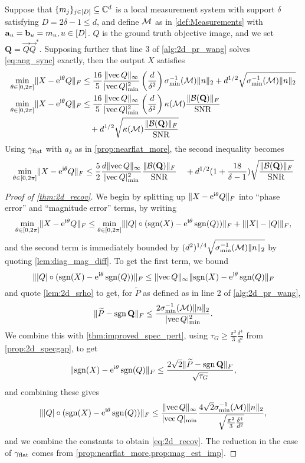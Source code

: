 \begin{theorem} \label{thm:2d_recov}
  Suppose that $\{m_j\}_{j \in [D]} \subseteq \mathbb{C}^d$ is a local measurement system with support $\delta$ satisfying $D = 2 \delta - 1 \le d$, and define $\mathcal{M}$ as in \eqref{def:Measurements} with $\mathbf a_u = \mathbf b_u = m_u, u \in [D]$.  $Q$ is the ground truth objective image, and we set $\mathbf{Q} = \vec Q \vec Q^*$.  Supposing further that line 3 of \cref{alg:2d_pr_wang} solves \eqref{eq:ang_sync} exactly, then the output $X$ satisfies
  \begin{equation}
    \begin{aligned}
      \min_{\theta \in [0, 2\pi]} \lVert X - \mathrm{e}^{\mathrm{i} \theta} Q\rVert_F &\le \frac{16}{5} \dfrac{\lVert\operatorname{vec} Q\rVert_\infty}{\lvert\operatorname{vec} Q\rvert_{\min}^2} \left(\dfrac{d}{\delta^2}\right) \sigma_{\min}^{-1}(\mathcal{M}) \lVert n\rVert_2 + d^{1/2} \sqrt{\sigma_{\min}^{-1}(\mathcal{M}) \lVert n\rVert_2} \\
      \min_{\theta \in [0, 2\pi]} \lVert X - \mathrm{e}^{\mathrm{i} \theta} Q\rVert_F &\le \frac{16}{5} \dfrac{\lVert\operatorname{vec} Q\rVert_\infty}{\lvert\operatorname{vec} Q\rvert_{\min}^2} \left(\dfrac{d}{\delta^2}\right) \kappa(\mathcal{M}) \frac{\lVert\mathcal{B}(\mathbf{Q})\rVert_F}{\operatorname{SNR}} \\ &\quad + d^{1/2} \sqrt{\kappa(\mathcal{M}) \frac{\lVert\mathcal{B}(\mathbf{Q})\rVert_F}{\operatorname{SNR}}} \\
    \end{aligned}
    \label{eq:2d_recov}
  \end{equation}
  Using $\gamma_{\rm flat}$ with $a_\delta$ as in \cref{prop:nearflat_more}, the second inequality becomes
  \[\min_{\theta \in [0, 2\pi]} \lVert X - \mathrm{e}^{\mathrm{i} \theta} Q\rVert_F \le \frac{5}{2} \dfrac{d \lVert\operatorname{vec} Q\rVert_\infty}{\lvert\operatorname{vec} Q\rvert_{\min}^2} \frac{\lVert\mathcal{B}(\mathbf{Q})\rVert_F}{\operatorname{SNR}} \quad + d^{1/2} (1 + \frac{18}{\delta - 1}) \sqrt{\frac{\lVert\mathcal{B}(\mathbf{Q})\rVert_F}{\operatorname{SNR}}}\]
\end{theorem}

\begin{proof}[Proof of \cref{thm:2d_recov}]
  We begin by splitting up $\lVert X - \mathrm{e}^{\mathrm{i} \theta} Q\rVert_F$ into ``phase error'' and ``magnitude error'' terms, by writing \[\min_{\theta \in [0, 2\pi]} \lVert X - \mathrm{e}^{\mathrm{i} \theta} Q\rVert_F \le \min_{\theta \in [0, 2\pi]} \lVert\lvert Q\rvert \circ (\operatorname{sgn}(X) - \mathrm{e}^{\mathrm{i} \theta} \operatorname{sgn}(Q))\rVert_F + \lVert\lvert X\rvert - \lvert Q\rvert\rVert_F,\] and the second term is immediately bounded by $(d^2)^{1/4} \sqrt{\sigma_{\min}^{-1}(\mathcal{M}) \lVert n\rVert_2}$ by quoting \cref{lem:diag_mag_diff}.  To get the first term, we bound \[\lVert\lvert Q\rvert \circ (\operatorname{sgn}(X) - \mathrm{e}^{\mathrm{i} \theta} \operatorname{sgn}(Q))\rVert_F \le \lVert\operatorname{vec} Q\rVert_\infty \lVert\operatorname{sgn}(X) - \mathrm{e}^{\mathrm{i} \theta} \operatorname{sgn}(Q)\rVert_F\] and quote \cref{lem:2d_srho} to get, for $\widetilde{P}$ as defined as in line 2 of \cref{alg:2d_pr_wang}, \[\lVert\widetilde{P} - \operatorname{sgn}{\mathbf{Q}}\rVert_F \le \frac{2 \sigma_{\min}^{-1}(\mathcal{M}) \lVert n\rVert_2}{\lvert\operatorname{vec} Q\rvert_{\min}^2}.\]  We combine this with \cref{thm:improved_spec_pert}, using $\tau_G \ge \frac{\pi^2}{3}\frac{\delta^4}{d^2}$ from \cref{prop:2d_specgap}, to get \[\lVert\operatorname{sgn}(X) - \mathrm{e}^{\mathrm{i} \theta} \operatorname{sgn}(Q)\rVert_F \le \dfrac{2 \sqrt{2} \lVert\widetilde{P} - \operatorname{sgn}{\mathbf{Q}}\rVert_F}{\sqrt{\tau_G}},\] and combining these gives \[\lVert\lvert Q\rvert \circ (\operatorname{sgn}(X) - \mathrm{e}^{\mathrm{i} \theta} \operatorname{sgn}(Q))\rVert_F \le \dfrac{\lVert\operatorname{vec} Q\rVert_\infty}{\lvert\operatorname{vec} Q\rvert_{\min}} \dfrac{4 \sqrt{2} \sigma_{\min}^{-1}(\mathcal{M}) \lVert n\rVert_2}{\sqrt{\frac{\pi^2}{3} \frac{\delta^4}{d^2}}},\] and we combine the constants to obtain \eqref{eq:2d_recov}.  The reduction in the case of $\gamma_{\rm flat}$ comes from \cref{prop:nearflat_more,prop:mag_est_imp}.
\end{proof}
